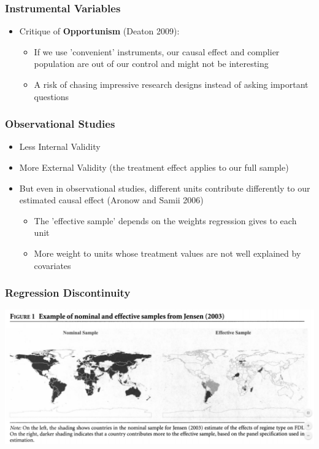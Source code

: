 \documentclass[xcolor=x11names,compress]{beamer}\usepackage[]{graphicx}\usepackage[]{xcolor}
\renewcommand{\(}{\begin{columns}}
\renewcommand{\)}{\end{columns}}
\newcommand{\<}[1]{\begin{column}{#1}}
\renewcommand{\>}{\end{column}}
\begin{document}
\begin{frame}
\frametitle{Instrumental Variables}
\begin{itemize}
\item Critique of \textbf{Opportunism} (Deaton 2009):
\pause
\begin{itemize}
\item If we use 'convenient' instruments, our causal effect and complier population are out of our control and might not be interesting
\pause
\item A risk of chasing impressive research designs instead of asking important questions
\end{itemize}
\end{itemize}
\end{frame}

\begin{frame}
\frametitle{Observational Studies}
\begin{itemize}
\item Less Internal Validity
\pause
\item More External Validity (the treatment effect applies to our full sample)
\pause
\item But even in observational studies, different units contribute differently to our estimated causal effect (Aronow and Samii 2006)
\pause
\begin{itemize}
\item The 'effective sample' depends on the weights regression gives to each unit
\pause
\item More weight to units whose treatment values are not well explained by covariates
\end{itemize}
\end{itemize}
\end{frame}

\begin{frame}
\frametitle{Regression Discontinuity}
\includegraphics[width=\textwidth]{Effective_Sample.png}
\end{frame}
\end{document}
